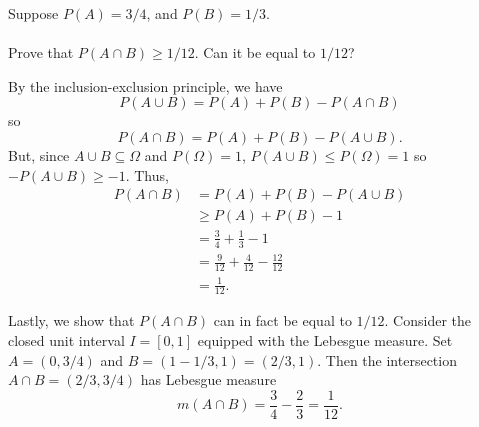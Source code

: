\begin{problem}[Handout 2, \# 17]
  Suppose \(P(A)=3/4\), and \(P(B)=1/3\).
  \\\\
  Prove that \(P(A\cap B)\geq 1/12\). Can it be equal to \(1/12\)?
\end{problem}
\begin{solution}
  By the inclusion-exclusion principle, we have
  \[
    P(A\cup B)=P(A)+P(B)-P(A\cap B)
  \]
  so
  \[
    P(A\cap B)=P(A)+P(B)-P(A\cup B).
  \]
  But, since \(A\cup B\subseteq\Omega\) and \(P(\Omega)=1\), \(P(A\cup
  B)\leq P(\Omega)=1\) so \(-P(A\cup B)\geq -1\). Thus,
  \begin{align*}
    P(A\cap B)&=P(A)+P(B)-P(A\cup B)\\
              &\geq P(A)+P(B)-1\\
              &=\frac{3}{4}+\frac{1}{3}-1\\
              &=\frac{9}{12}+\frac{4}{12}-\frac{12}{12}\\
              &=\frac{1}{12}.
  \end{align*}

  Lastly, we show that \(P(A\cap B)\) can in fact be equal to
  \(1/12\). Consider the closed unit interval \(I=[0,1]\) equipped with the
  Lebesgue measure. Set \(A=(0,3/4)\) and \(B=(1-1/3,1)=(2/3,1)\). Then the
  intersection \(A\cap B=(2/3,3/4)\) has Lebesgue measure
  \[
    m(A\cap B)=\frac{3}{4}-\frac{2}{3}=\frac{1}{12}.
  \]
\end{solution}
\newpage

